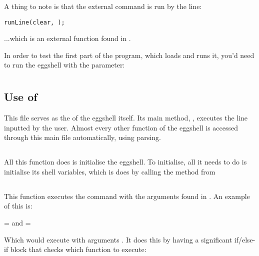\documentclass[12pt, a4paper]{report}
\begin{document}
                A thing to note is that the external command  is run by the line:

                \texttt{runLine(\quot clear\quot, \quot\quot);}

                ...which is an external function found in .

                 In order to test the first part of the program,
                which loads  and runs it, you'd need to run
                the eggshell with the  parameter: 

                \clearpage


        \clearpage

        \section{}
            \subsection{Use of }
                This file serves as the  of the eggshell itself.
                Its main method, , executes the line inputted
                by the user. Almost every other function of the eggshell is
                accessed through this main file automatically, using parsing.

            \subsection{}
                All this function does is initialise the eggshell. To initialise,
                all it needs to do is initialise its shell variables, which is 
                does by calling the method  from

            \subsection{}
                This function executes the command  with the
                arguments found in . An example of this is:

                 =  and  = 

                Which would execute  with arguments . It does this
                by having a significant if/else-if block that checks which function to execute:
\end{document}
